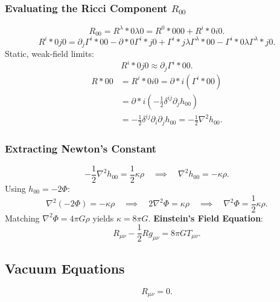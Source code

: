 \documentclass[11pt, a4paper]{report}
\begin{document}
\subsubsection*{Evaluating the Ricci Component $R_{00}$}
\begin{equation}
R_{00} = {R^{\lambda}}*{0\lambda 0} = {R^{0}}*{000} + {R^{i}}*{0i0}.
\end{equation}
\begin{equation}
{R^{i}}*{0j0} = \partial_{j}\Gamma^{i}*{00} - \partial*{0}\Gamma^{i}*{j0} + \Gamma^{i}*{j\lambda}\Gamma^{\lambda}*{00} - \Gamma^{i}*{0\lambda}\Gamma^{\lambda}*{j0}.
\end{equation}
Static, weak-field limits:
\begin{equation}
{R^{i}}*{0j0} \approx \partial_{j}\Gamma^{i}*{00}.
\end{equation}
\begin{align}
R*{00} &= {R^{i}}*{0i0} = \partial*{i}(\Gamma^{i}*{00}) \nonumber \\
&= \partial*{i}\left(-\frac{1}{2}\delta^{ij}\partial_{j}h_{00}\right) \nonumber \\
&= -\frac{1}{2}\delta^{ij}\partial_{i}\partial_{j}h_{00} = -\frac{1}{2}\nabla^{2}h_{00}.
\end{align}

\subsubsection*{Extracting Newton's Constant}
\begin{equation}
-\frac{1}{2}\nabla^{2}h_{00} = \frac{1}{2}\kappa\rho \quad \implies \quad \nabla^{2}h_{00} = -\kappa\rho.
\end{equation}
Using $h_{00} = -2\Phi$:
\begin{equation}
\nabla^{2}(-2\Phi) = -\kappa\rho \quad \implies \quad 2\nabla^{2}\Phi = \kappa\rho \quad \implies \quad \nabla^{2}\Phi = \frac{1}{2}\kappa\rho.
\end{equation}
Matching $\nabla^{2}\Phi = 4\pi G\rho$ yields $\kappa = 8\pi G$.
\textbf{Einstein's Field Equation}:
\begin{equation}
\label{eq:einstein_field_equation}
R_{\mu\nu} - \frac{1}{2}R g_{\mu\nu} = 8\pi G T_{\mu\nu}.
\end{equation}

\subsection{Vacuum Equations}
\begin{equation}
R_{\mu\nu} = 0.
\end{equation}
\end{document}
